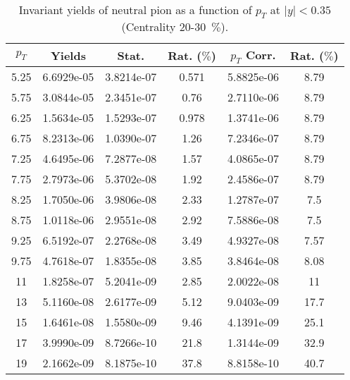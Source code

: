             
\begin{table}[!htb]
\centering
\begin{tabular}{|c|c|c|c|c|c|}
\hline
$p_{T}$ & Yields & Stat. & Rat. ($\%$) & $p_{T}$ Corr. & Rat. ($\%$) \\
\hline
5.25 & 6.6929e-05 & 3.8214e-07 & 0.571 & 5.8825e-06 & 8.79 \\ 
5.75 & 3.0844e-05 & 2.3451e-07 & 0.76 & 2.7110e-06 & 8.79 \\ 
6.25 & 1.5634e-05 & 1.5293e-07 & 0.978 & 1.3741e-06 & 8.79 \\ 
6.75 & 8.2313e-06 & 1.0390e-07 & 1.26 & 7.2346e-07 & 8.79 \\ 
7.25 & 4.6495e-06 & 7.2877e-08 & 1.57 & 4.0865e-07 & 8.79 \\ 
7.75 & 2.7973e-06 & 5.3702e-08 & 1.92 & 2.4586e-07 & 8.79 \\ 
8.25 & 1.7050e-06 & 3.9806e-08 & 2.33 & 1.2787e-07 & 7.5 \\ 
8.75 & 1.0118e-06 & 2.9551e-08 & 2.92 & 7.5886e-08 & 7.5 \\ 
9.25 & 6.5192e-07 & 2.2768e-08 & 3.49 & 4.9327e-08 & 7.57 \\ 
9.75 & 4.7618e-07 & 1.8355e-08 & 3.85 & 3.8464e-08 & 8.08 \\ 
11 & 1.8258e-07 & 5.2041e-09 & 2.85 & 2.0022e-08 & 11 \\ 
13 & 5.1160e-08 & 2.6177e-09 & 5.12 & 9.0403e-09 & 17.7 \\ 
15 & 1.6461e-08 & 1.5580e-09 & 9.46 & 4.1391e-09 & 25.1 \\ 
17 & 3.9990e-09 & 8.7266e-10 & 21.8 & 1.3144e-09 & 32.9 \\ 
19 & 2.1662e-09 & 8.1875e-10 & 37.8 & 8.8158e-10 & 40.7 \\ 
\hline
\end{tabular}
\caption{Invariant yields of neutral pion as a function of $p_{T}$ at $|y|<0.35$ (Centrality 20-30~$\%$).}
\end{table}
            
